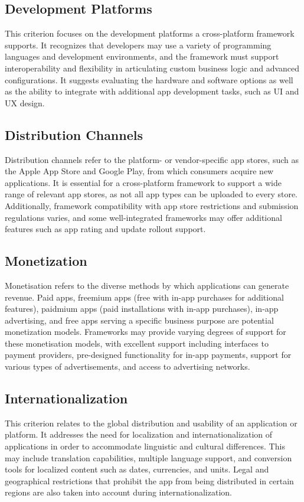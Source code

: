 \subsection{Development Platforms} 
This criterion focuses on the development platforms a cross-platform framework supports. It recognizes that developers may use a variety of programming languages and development environments, and the framework must support interoperability and flexibility in articulating custom business logic and advanced configurations. It suggests evaluating the hardware and software options as well as the ability to integrate with additional app development tasks, such as UI and UX design.

\subsection{Distribution Channels} 
Distribution channels refer to the platform- or vendor-specific app stores, such as the Apple App Store and Google Play, from which consumers acquire new applications. It is essential for a cross-platform framework to support a wide range of relevant app stores, as not all app types can be uploaded to every store. Additionally, framework compatibility with app store restrictions and submission regulations varies, and some well-integrated frameworks may offer additional features such as app rating and update rollout support.

\subsection{Monetization}
Monetisation refers to the diverse methods by which applications can generate revenue. Paid apps, freemium apps (free with in-app purchases for additional features), paidmium apps (paid installations with in-app purchases), in-app advertising, and free apps serving a specific business purpose are potential monetization models. Frameworks may provide varying degrees of support for these monetisation models, with excellent support including interfaces to payment providers, pre-designed functionality for in-app payments, support for various types of advertisements, and access to advertising networks.

\subsection{Internationalization}
This criterion relates to the global distribution and usability of an application or platform. It addresses the need for localization and internationalization of applications in order to accommodate linguistic and cultural differences. This may include translation capabilities, multiple language support, and conversion tools for localized content such as dates, currencies, and units. Legal and geographical restrictions that prohibit the app from being distributed in certain regions are also taken into account during internationalization.

